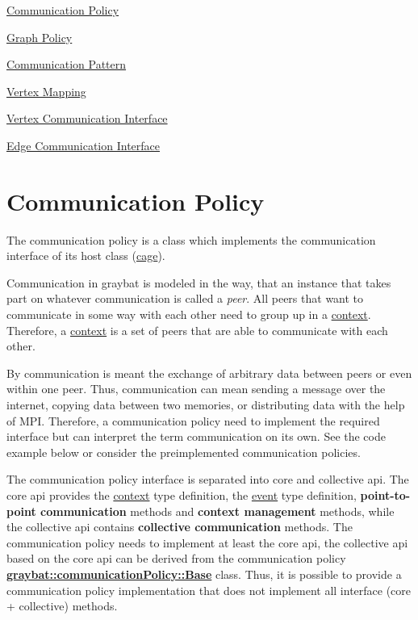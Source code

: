 \begin{DoxyItemize}
\item \hyperlink{communicationPolicy}{Communication Policy}
\item \hyperlink{graphPolicy}{Graph Policy}
\item \hyperlink{communicationPattern}{Communication Pattern}
\item \hyperlink{mapping}{Vertex Mapping}
\item \hyperlink{vertex}{Vertex Communication Interface}
\item \hyperlink{edge}{Edge Communication Interface} 
\end{DoxyItemize}\hypertarget{communicationPolicy}{}\section{Communication Policy}\label{communicationPolicy}
The communication policy is a class which implements the communication interface of its host class (\hyperlink{cage}{cage}).

Communication in graybat is modeled in the way, that an instance that takes part on whatever communication is called a {\itshape peer}. All peers that want to communicate in some way with each other need to group up in a \hyperlink{context}{context}. Therefore, a \hyperlink{context}{context} is a set of peers that are able to communicate with each other.

By communication is meant the exchange of arbitrary data between peers or even within one peer. Thus, communication can mean sending a message over the internet, copying data between two memories, or distributing data with the help of M\+P\+I. Therefore, a communication policy need to implement the required interface but can interpret the term communication on its own. See the code example below or consider the preimplemented communication policies.

The communication policy interface is separated into core and collective api. The core api provides the \hyperlink{context}{context} type definition, the \hyperlink{event}{event} type definition, {\bfseries point-\/to-\/point communication} methods and {\bfseries context management} methods, while the collective api contains {\bfseries collective communication} methods. The communication policy needs to implement at least the core api, the collective api based on the core api can be derived from the communication policy {\bfseries \hyperlink{structgraybat_1_1communicationPolicy_1_1Base}{graybat\+::communication\+Policy\+::\+Base}} class. Thus, it is possible to provide a communication policy implementation that does not implement all interface (core + collective) methods.

